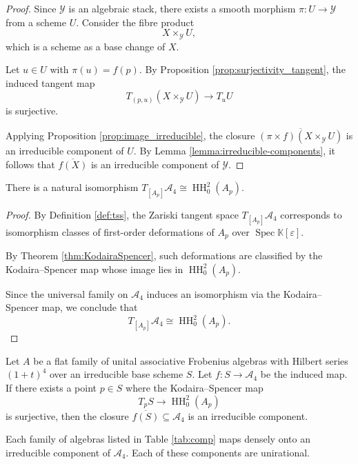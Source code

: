 \documentclass{amsart}
\def\HH{\operatorname{HH}}
\begin{document}
\begin{proof}  
Since \(\mathcal{Y}\) is an algebraic stack, there exists a smooth morphism \(\pi: U \to \mathcal{Y}\) from a scheme \(U\). Consider the fibre product $$ X \times_{\mathcal{Y}} U, $$
which is a scheme as a base change of \(X\).

Let \( u \in U \) with \(\pi(u) = f(p)\). By Proposition \ref{prop:surjectivity_tangent}, the induced tangent map
\[
T_{(p,u)}(X \times_{\mathcal{Y}} U) \to T_u U
\]
is surjective.

Applying Proposition \ref{prop:image_irreducible}, the closure \(\overline{(\pi \times f)(X \times_{\mathcal{Y}} U)}\) is an irreducible component of \( U \). By Lemma \ref{lemma:irreducible-components}, it follows that \(\overline{f(X)}\) is an irreducible component of \(\mathcal{Y}\).

\end{proof}

\begin{proposition}
    \textnormal{There is a natural isomorphism } $T_{[A_p]} \mathcal{A}_4 \cong \HH^2_0(A_p).$
\end{proposition}

\begin{proof} 
By Definition \ref{def:tss}, the Zariski tangent space \(T_{[A_p]} \mathcal{A}_4\) corresponds to isomorphism classes of first-order deformations of \(A_p\) over \(\operatorname{Spec} \mathbb{K}[\varepsilon]\).

By Theorem \ref{thm:KodairaSpencer}, such deformations are classified by the Kodaira–Spencer map whose image lies in \(\HH^2_0(A_p)\).

Since the universal family on \(\mathcal{A}_4\) induces an isomorphism via the Kodaira–Spencer map, we conclude that
\[
T_{[A_p]} \mathcal{A}_4 \cong \HH^2_0(A_p).
\]
\end{proof}
\begin{corollary}\label{corr510}
Let \( A \) be a flat family of unital associative Frobenius algebras with Hilbert series $(1+t)^4$ over an irreducible base scheme \( S \). Let $f: S \to \mathcal{A}_4$ be the induced map. 
If there exists a point \( p \in S \) where the Kodaira–Spencer map
\[
T_p S \to \HH^2_0(A_p)
\]
is surjective, then the closure \( \overline{f(S)} \subseteq \mathcal{A}_4 \) is an irreducible component.
\end{corollary}


\begin{theorem}\label{mainthm511}
Each family of algebras listed in Table \ref{tab:comp} maps densely onto an irreducible component of \(\mathcal{A}_4\).  Each of these components are unirational.
\end{theorem}
\end{document}
